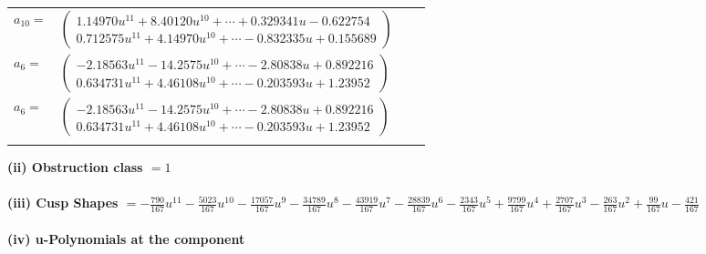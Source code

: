 \documentclass[1p]{elsarticle_modified}
\theoremstyle{definition}
\begin{document}
\begin{tabular}{m{7pt} m{180pt} m{7pt} m{180pt} }
\flushright $a_{10}=$&$\begin{pmatrix}1.14970 u^{11}+8.40120 u^{10}+\cdots+0.329341 u-0.622754\\0.712575 u^{11}+4.14970 u^{10}+\cdots-0.832335 u+0.155689\end{pmatrix}$ \\
\flushright $a_{6}=$&$\begin{pmatrix}-2.18563 u^{11}-14.2575 u^{10}+\cdots-2.80838 u+0.892216\\0.634731 u^{11}+4.46108 u^{10}+\cdots-0.203593 u+1.23952\end{pmatrix}$\\ \flushright $a_{6}=$&$\begin{pmatrix}-2.18563 u^{11}-14.2575 u^{10}+\cdots-2.80838 u+0.892216\\0.634731 u^{11}+4.46108 u^{10}+\cdots-0.203593 u+1.23952\end{pmatrix}$\\&\end{tabular}
\flushleft \textbf{(ii) Obstruction class $= 1$}\\~\\
\flushleft \textbf{(iii) Cusp Shapes $= -\frac{790}{167} u^{11}-\frac{5023}{167} u^{10}-\frac{17057}{167} u^9-\frac{34789}{167} u^8-\frac{43919}{167} u^7-\frac{28839}{167} u^6-\frac{2343}{167} u^5+\frac{9799}{167} u^4+\frac{2707}{167} u^3-\frac{263}{167} u^2+\frac{99}{167} u-\frac{421}{167}$}\\~\\
\newpage\renewcommand{\arraystretch}{1}
\flushleft \textbf{(iv) u-Polynomials at the component}\newline \\
\end{document}
